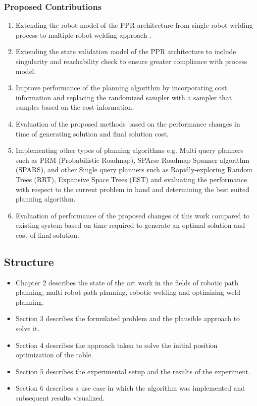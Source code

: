 \subsubsection{Proposed Contributions}
\begin{enumerate}
\item Extending the robot model of the PPR architecture from single robot welding process to
multiple robot welding approach .
\item Extending the state validation model of the PPR architecture to include singularity and
reachability check to ensure greater compliance with process model.
\item Improve performance of the planning algorithm by incorporating cost information and
replacing the randomized sampler with a sampler that samples based on the cost
information.
\item Evaluation of the proposed methods based on the performance changes in time of
generating solution and final solution cost.
\item Implementing other types of planning algorithms e.g. Multi query planners such as PRM
(Probabilistic Roadmap), SPArse Roadmap Spanner algorithm (SPARS), and other Single
query planners such as Rapidly-exploring Random Trees (RRT), Expansive Space Trees
(EST) and evaluating the performance with respect to the current problem in hand and
determining the best suited planning algorithm.
\item Evaluation of performance of the proposed changes of this work compared to existing
system based on time required to generate an optimal solution and cost of final solution.
\end{enumerate}
\subsection{Structure}
\begin{itemize}
 \item Chapter 2 describes the state of the art work in the fields of robotic path planning, multi robot path planning, robotic welding and optimizing weld planning.
 \item Section 3 describes the formulated problem and the plausible approach to solve it.
 \item Section 4 describes the approach taken to solve the initial position optimization of the table.
 \item Section 5 describes the experimental setup and the results of the experiment.
 \item Section 6 describes a use case in which the algorithm was implemented and subsequent results visualized.
 \end{itemize}







